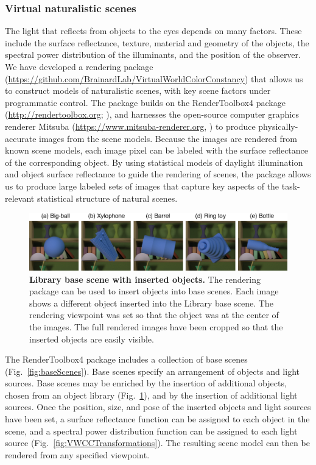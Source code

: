 \documentclass{jov}
\begin{document}
\subsubsection{Virtual naturalistic scenes}
The light that reflects from objects to the eyes depends on many factors.
These include the surface reflectance, texture, material and geometry of the objects, 
the spectral power distribution of the illuminants, and the position of the observer.
We have developed a rendering package 
(\href{https://github.com/BrainardLab/VirtualWorldColorConstancy}{https://github.com/BrainardLab/VirtualWorldColorConstancy}) 
that allows us to construct models of naturalistic scenes, with key scene factors under programmatic control.
The package builds on the RenderToolbox4 package (\href{http://rendertoolbox.org}{http://rendertoolbox.org}; ),
and harnesses the open-source computer graphics renderer Mitsuba (\href{https://www.mitsuba-renderer.org}{https://www.mitsuba-renderer.org}, 
) to produce physically-accurate images from the scene models.
Because the images are rendered from known scene models, each image pixel can be labeled with 
the surface reflectance of the corresponding object.
By using statistical models of daylight illumination and object surface reflectance to guide the rendering of scenes, 
the package allows us to produce large labeled sets of images that capture key aspects of the task-relevant 
statistical structure of natural scenes.

\begin{figure}
\centering
\includegraphics{Figure3.eps}
\caption{{\bf Library base scene with inserted objects.} The rendering package can be used to insert objects into base scenes. Each image shows a different object inserted into the Library base scene. The rendering viewpoint was set so that the object was at the center of the images. The full rendered images have been cropped so that the inserted objects are easily visible.}\label{fig:libraryWithTarget}
\end{figure}

The RenderToolbox4 package includes a collection of base scenes (Fig.~\ref{fig:baseScenes}).
Base scenes specify an arrangement of objects and light sources.
Base scenes may be enriched by the insertion of additional objects, chosen from an object library (Fig.~\ref{fig:libraryWithTarget}), and by the insertion of additional light sources.
Once the position, size, and pose of the inserted objects and light sources have been set, 
a surface reflectance function can be assigned to each object in the scene, and a spectral power distribution function can be assigned to each light source (Fig.~\ref{fig:VWCCTransformations}). The resulting scene model can then be rendered from any specified viewpoint.
\end{document}
